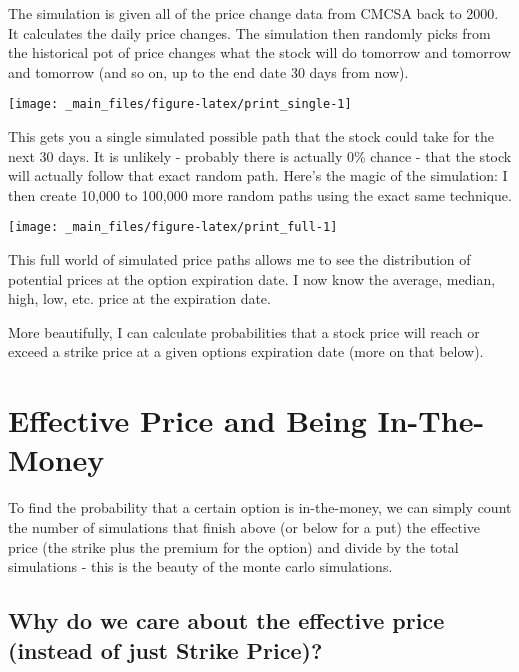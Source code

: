 \documentclass[
]{book}
\begin{document}
The simulation is given all of the price change data from CMCSA back to 2000. It
calculates the daily price changes. The simulation then randomly picks from the
historical pot of price changes what the stock will do tomorrow and tomorrow and
tomorrow (and so on, up to the end date 30 days from now).

\begin{center}\texttt{[image: \_main\_files/figure-latex/print\_single-1]} \end{center}

This gets you a single simulated possible path that the stock could take for the
next 30 days. It is unlikely - probably there is actually 0\% chance - that the
stock will actually follow that exact random path. Here's the magic of the
simulation: I then create 10,000 to 100,000 more random paths using the exact
same technique.

\begin{center}\texttt{[image: \_main\_files/figure-latex/print\_full-1]} \end{center}

This full world of simulated price paths allows me to see the distribution of
potential prices at the option expiration date. I now know the average, median,
high, low, etc. price at the expiration date.

More beautifully, I can calculate probabilities that a stock price will reach
or exceed a strike price at a given options expiration date (more on that below).

\hypertarget{effective-price-and-being-in-the-money}{%
\section{Effective Price and Being In-The-Money}\label{effective-price-and-being-in-the-money}}

To find the probability that a certain option is in-the-money, we can simply
count the number of simulations that finish above (or below for a put) the
effective price (the strike plus the premium for the option) and divide by the
total simulations - this is the beauty of the monte carlo simulations.

\hypertarget{why-do-we-care-about-the-effective-price-instead-of-just-strike-price}{%
\subsection{Why do we care about the effective price (instead of just Strike Price)?}\label{why-do-we-care-about-the-effective-price-instead-of-just-strike-price}}
\end{document}
